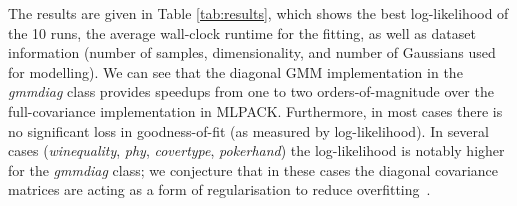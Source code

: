\documentclass[10pt,a4paper]{article}
\def\_{{\tt\char95}}
\begin{document}
The results are given in Table \ref{tab:results}, which shows the best log-likelihood of the 10 runs,
the average wall-clock runtime for the fitting,
as well as dataset information
(number of samples, dimensionality, and number of Gaussians used for modelling).
We can see that the diagonal GMM implementation in 
the {\it gmm\_diag} class provides speedups from one to two orders-of-magnitude
over the full-covariance implementation in \mbox{MLPACK}.
Furthermore, in most cases there is no significant loss in goodness-of-fit (as measured by log-likelihood).
In several cases ({\it winequality}, {\it phy}, {\it covertype}, {\it pokerhand})
the log-likelihood is notably higher for the {\it gmm\_diag} class;
we conjecture that in these cases the diagonal covariance matrices are acting as a form of regularisation to reduce overfitting~\cite{Bishop_2006}.
\end{document}

